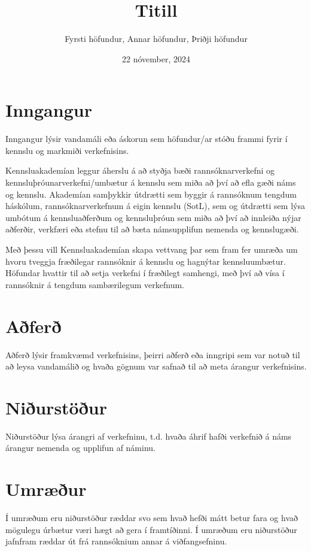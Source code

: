 \documentclass{kennsluakademia_conf}
\date{22 nóvember, 2024}
\title{Titill}
\author{%
Fyrsti höfundur\autid{1}{0000-0000-0000-0000}, 
Annar höfundur\autid{1}{0000-0000-0000-0000}, 
Þriðji höfundur\autid{2}{0000-0000-0000-0000}%
}
\affil{1}{Deild, háskóli}
\affil{2}{Önnur deild, háskóli}
\begin{document}
\maketitle

\section{Inngangur}

Inngangur lýsir vandamáli eða áskorun sem höfundur/ar stóðu frammi fyrir í kennslu og markmiði verkefnisins.  

Kennsluakademían leggur áherslu á að styðja bæði rannsóknarverkefni og kennsluþróunarverkefni/umbætur á kennslu sem miða að því að efla gæði náms og kennslu. Akademían samþykkir  útdrætti sem byggir á rannsóknum tengdum háskólum, rannsóknarverkefnum á eigin kennslu (SotL), sem og útdrætti sem lýsa umbótum á kennsluaðferðum og kennsluþróun sem miða að því að innleiða nýjar aðferðir, verkfæri eða stefnu til að bæta námsupplifun nemenda og kennslugæði. 

Með þessu vill Kennsluakademían skapa vettvang þar sem fram fer umræða um hvoru tveggja fræðilegar rannsóknir á kennslu og hagnýtar kennsluumbætur.  Höfundar hvattir til að setja verkefni í fræðilegt samhengi, með því að vísa í rannsóknir á tengdum sambærilegum verkefnum.  

\section{Aðferð}

Aðferð lýsir framkvæmd verkefnisins, þeirri aðferð eða inngripi sem var notuð til að leysa vandamálið og hvaða gögnum var safnað til að meta árangur verkefnisins. 

\section{Niðurstöður}

Niðurstöður lýsa árangri af verkefninu, t.d. hvaða áhrif hafði verkefnið á náms árangur nemenda og upplifun af náminu.

\section{Umræður}

Í umræðum eru niðurstöður ræddar svo sem hvað hefði mátt betur fara og hvað mögulegu úrbætur væri hægt að gera í framtíðinni. Í umræðum eru niðurstöður jafnfram ræddar út frá rannsóknium annar á viðfangsefninu.  

\nocite{*}

  
  
\end{document}
